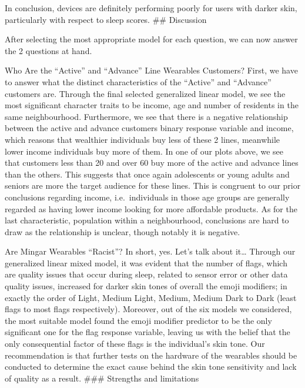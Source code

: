 \documentclass[
          english,
          paper=a4,
              ,captions=tableheading
  ]{scrartcl}
\begin{document}
In conclusion, devices are definitely performing poorly for users with
darker skin, particularly with respect to sleep scores. \#\# Discussion

After selecting the most appropriate model for each question, we can now
answer the 2 questions at hand.

Who Are the ``Active'' and ``Advance'' Line Wearables Customers? First,
we have to answer what the distinct characteristics of the ``Active''
and ``Advance'' customers are. Through the final selected generalized
linear model, we see the most significant character traits to be income,
age and number of residents in the same neighbourhood. Furthermore, we
see that there is a negative relationship between the active and advance
customers binary response variable and income, which reasons that
wealthier individuals buy less of these 2 lines, meanwhile lower income
individuals buy more of them. In one of our plots above, we see that
customers less than 20 and over 60 buy more of the active and advance
lines than the others. This suggests that once again adolescents or
young adults and seniors are more the target audience for these lines.
This is congruent to our prior conclusions regarding income,
i.e.~individuals in those age groups are generally regarded as having
lower income looking for more affordable products. As for the last
characteristic, population within a neighbourhood, conclusions are hard
to draw as the relationship is unclear, though notably it is negative.

Are Mingar Wearables ``Racist''? In short, yes. Let's talk about
it\ldots{} Through our generalized linear mixed model, it was evident
that the number of flags, which are quality issues that occur during
sleep, related to sensor error or other data quality issues, increased
for darker skin tones of overall the emoji modifiers; in exactly the
order of Light, Medium Light, Medium, Medium Dark to Dark (least flags
to most flags respectively). Moreover, out of the six models we
considered, the most suitable model found the emoji modifier predictor
to be the only significant one for the flag response variable, leaving
us with the belief that the only consequential factor of these flags is
the individual's skin tone. Our recommendation is that further tests on
the hardware of the wearables should be conducted to determine the exact
cause behind the skin tone sensitivity and lack of quality as a result.
\#\#\# Strengths and limitations
\end{document}
